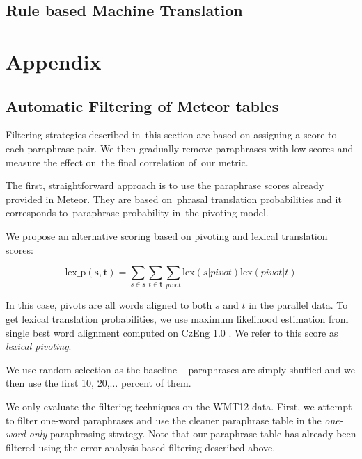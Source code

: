 \documentclass[11pt]{article}
\begin{document}
\subsection{Rule based Machine Translation}






\section*{Appendix}
\label{multiword_filtering}
\subsection*{Automatic Filtering of Meteor tables}
Filtering strategies described in~this section are based on assigning a score to
each paraphrase pair. We then gradually remove paraphrases with low scores and
measure the effect on~the final correlation of~our metric.

The first, straightforward approach is to use the paraphrase scores already
provided in Meteor. They are based on~phrasal translation probabilities
and it corresponds to~paraphrase probability in~the pivoting model.

We propose an alternative scoring based on pivoting and lexical translation
scores:

$$\text{lex\_p}(\mathbf{s},\mathbf{t}) = \sum_{s \in \mathbf{s}}\sum_{t \in
\mathbf{t}}\sum_{pivot}\text{lex}(s|pivot)\text{lex}(pivot|t)$$

In this case, pivots are all words aligned to both $s$ and $t$ in the parallel
data. To get lexical translation probabilities, we use maximum likelihood
estimation from single best word alignment computed on CzEng 1.0
\cite{czeng10:lrec2012}. We refer to this score as \emph{lexical
pivoting}.

We use random selection as the baseline -- paraphrases are simply shuffled and we
then use the first 10, 20,$\ldots$ percent of them.

We only evaluate the filtering techniques on the WMT12 data. First, we attempt
to filter one-word paraphrases and use the cleaner paraphrase table in the
\emph{one-word-only} paraphrasing strategy. Note that our paraphrase table has
already been filtered using the error-analysis based filtering described above.
\end{document}
